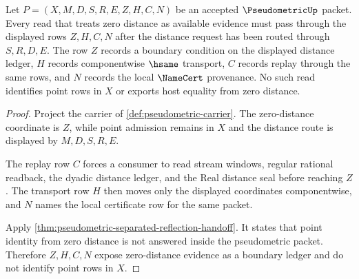 \begin{theorem}
\label{thm:pseudometric-zero-distance-boundary-obligation}
Let $P=(X,M,D,S,R,E,Z,H,C,N)$ be an accepted $\PseudometricUp$ packet. Every read that treats zero distance as available evidence must pass through the displayed rows $Z,H,C,N$ after the distance request has been routed through $S,R,D,E$. The row $Z$ records a boundary condition on the displayed distance ledger, $H$ records componentwise $\hsame$ transport, $C$ records replay through the same rows, and $N$ records the local $\NameCert$ provenance. No such read identifies point rows in $X$ or exports host equality from zero distance.
\end{theorem}
\begin{proof}
Project the carrier of \autoref{def:pseudometric-carrier}. The zero-distance coordinate is $Z$, while point admission remains in $X$ and the distance route is displayed by $M,D,S,R,E$.

The replay row $C$ forces a consumer to read stream windows, regular rational readback, the dyadic distance ledger, and the Real distance seal before reaching $Z$. The transport row $H$ then moves only the displayed coordinates componentwise, and $N$ names the local certificate row for the same packet.

Apply \autoref{thm:pseudometric-separated-reflection-handoff}. It states that point identity from zero distance is not answered inside the pseudometric packet. Therefore $Z,H,C,N$ expose zero-distance evidence as a boundary ledger and do not identify point rows in $X$.
\end{proof}


